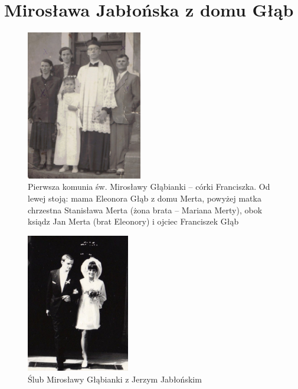 \section{Mirosława Jabłońska z domu Głąb}
   
\begin{figure}[!h]
\begin{center}
\includegraphics[width=0.45\textwidth]{zdjecia/pierwsza_komunia_miroslawy_glab.jpg}
\caption[Pierwsza Komunia św. Mirosławy Głąbianki]{Pierwsza komunia św. Mirosławy Głąbianki -- córki Franciszka. Od lewej stoją: mama Eleonora Głąb z domu Merta, powyżej matka chrzestna Stanisława Merta (żona brata -- Mariana Merty), obok ksiądz Jan Merta (brat Eleonory) i ojciec Franciszek Głąb}
\label{rys:pierwsza_komunia_miroslawy_glab}
\end{center}
\end{figure}

\begin{figure}[!hb]
\begin{center}
\includegraphics[width=0.4\textwidth]{zdjecia/slub_jerzego_i_miroslawy_jablonskich.jpg}
\caption{Ślub Mirosławy Głąbianki z Jerzym Jabłońskim}
\label{rys:slub_jerzego_i_miroslawy_jablonskich}
\end{center}
\end{figure}

